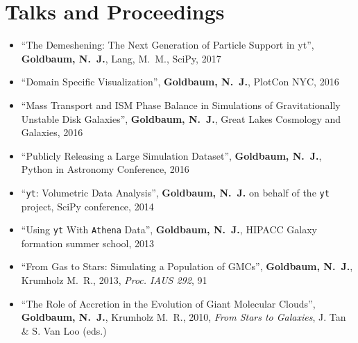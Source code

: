 \documentclass[10pt,letterpaper]{article}
\begin{document}
\section*{Talks and Proceedings}

\begin{itemize}
\item[] ``The Demeshening: The Next Generation of Particle Support in yt'',
  {\bf Goldbaum, N.~J.}, Lang, M.~M., SciPy, 2017
\item[] ``Domain Specific Visualization'', {\bf Goldbaum, N.~J.}, PlotCon NYC,
  2016
\item[] ``Mass Transport and ISM Phase Balance in Simulations of Gravitationally
  Unstable Disk Galaxies'', {\bf Goldbaum, N.~J.}, Great Lakes Cosmology and
  Galaxies, 2016
\item[] ``Publicly Releasing a Large Simulation Dataset'', {\bf Goldbaum,
    N.~J.}, Python in Astronomy Conference, 2016
\item[] ``\texttt{yt}: Volumetric Data Analysis'', {\bf Goldbaum, N.~J.} on
  behalf of the \texttt{yt} project, SciPy conference, 2014
\item[] ``Using \texttt{yt} With \texttt{Athena} Data'', {\bf Goldbaum, N.~J.},
  HIPACC Galaxy formation summer school, 2013
\item[] ``From Gas to Stars: Simulating a Population of GMCs'', {\bf Goldbaum,
    N.~J.}, Krumholz M.~R., 2013, \textit{Proc. IAUS 292}, 91
\item[] ``The Role of Accretion in the Evolution of Giant Molecular Clouds'',
  {\bf Goldbaum, N.~J.}, Krumholz M.~R., 2010, \textit{From Stars to Galaxies},
  J. Tan \& S. Van Loo (eds.)

\end{itemize}
\end{document}
